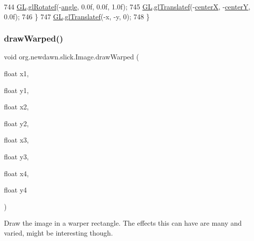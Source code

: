 \begin{DoxyCode}
744             \mbox{\hyperlink{classorg_1_1newdawn_1_1slick_1_1_image_aafbab31355bec79e747f477e970dcda4}{GL}}.\mbox{\hyperlink{interfaceorg_1_1newdawn_1_1slick_1_1opengl_1_1renderer_1_1_s_g_l_ac5675bd1b391998a8bf63d5d87a04347}{glRotatef}}(-\mbox{\hyperlink{classorg_1_1newdawn_1_1slick_1_1_image_a4076b08a44e95eba2b65075342f16070}{angle}}, 0.0f, 0.0f, 1.0f); 
745             \mbox{\hyperlink{classorg_1_1newdawn_1_1slick_1_1_image_aafbab31355bec79e747f477e970dcda4}{GL}}.\mbox{\hyperlink{interfaceorg_1_1newdawn_1_1slick_1_1opengl_1_1renderer_1_1_s_g_l_a647aff6cabd0c83869166144e9aee833}{glTranslatef}}(-\mbox{\hyperlink{classorg_1_1newdawn_1_1slick_1_1_image_aef548becf8450e7173bbd8bded5b6b48}{centerX}}, -\mbox{\hyperlink{classorg_1_1newdawn_1_1slick_1_1_image_a3935c6eead627c8aa8667985fc314496}{centerY}}, 0.0f); 
746         \}
747         \mbox{\hyperlink{classorg_1_1newdawn_1_1slick_1_1_image_aafbab31355bec79e747f477e970dcda4}{GL}}.\mbox{\hyperlink{interfaceorg_1_1newdawn_1_1slick_1_1opengl_1_1renderer_1_1_s_g_l_a647aff6cabd0c83869166144e9aee833}{glTranslatef}}(-x, -y, 0);
748     \} 
\end{DoxyCode}
\mbox{\label{classorg_1_1newdawn_1_1slick_1_1_image_a1f716a14c4d4c0d9b3265a80c8e102d1}} 
\subsubsection{\texorpdfstring{draw\+Warped()}{drawWarped()}}
{\footnotesize\ttfamily void org.\+newdawn.\+slick.\+Image.\+draw\+Warped (\begin{DoxyParamCaption}\item[{float}]{x1,  }\item[{float}]{y1,  }\item[{float}]{x2,  }\item[{float}]{y2,  }\item[{float}]{x3,  }\item[{float}]{y3,  }\item[{float}]{x4,  }\item[{float}]{y4 }\end{DoxyParamCaption})\hspace{0.3cm}{\ttfamily [inline]}}

Draw the image in a warper rectangle. The effects this can have are many and varied, might be interesting though.


